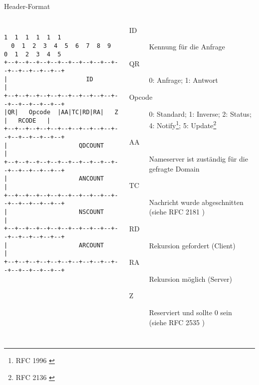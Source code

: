 \documentclass{beamer}
\begin{document}
  \begin{frame}[fragile]{\mytitle}{Header-Format}
    \begin{columns}[c]
      \column{5cm}
      \tiny{
        \begin{verbatim}
                                1  1  1  1  1  1
  0  1  2  3  4  5  6  7  8  9  0  1  2  3  4  5
+--+--+--+--+--+--+--+--+--+--+--+--+--+--+--+--+
|                      ID                       |
+--+--+--+--+--+--+--+--+--+--+--+--+--+--+--+--+
|QR|   Opcode  |AA|TC|RD|RA|   Z    |   RCODE   |
+--+--+--+--+--+--+--+--+--+--+--+--+--+--+--+--+
|                    QDCOUNT                    |
+--+--+--+--+--+--+--+--+--+--+--+--+--+--+--+--+
|                    ANCOUNT                    |
+--+--+--+--+--+--+--+--+--+--+--+--+--+--+--+--+
|                    NSCOUNT                    |
+--+--+--+--+--+--+--+--+--+--+--+--+--+--+--+--+
|                    ARCOUNT                    |
+--+--+--+--+--+--+--+--+--+--+--+--+--+--+--+--+
        \end{verbatim}
      } 
      \column{7cm}
      \footnotesize{
        \begin{description}
          \item[ID] Kennung für die Anfrage
          \item[QR] 0: Anfrage; 1: Antwort
          \item[Opcode] 0: Standard; 1: Inverse; 2: Status; 4: Notify\footnote{RFC 1996 \cite{rfc1996}}; 5: Update\footnote{RFC 2136 \cite{rfc2136}}
          \item[AA] Nameserver ist zuständig für die gefragte Domain
          \item[TC] Nachricht wurde abgeschnitten (siehe RFC 2181 \cite{rfc2181})
          \item[RD] Rekursion gefordert (Client)
          \item[RA] Rekursion möglich (Server)
          \item[Z] Reserviert und sollte 0 sein\\(siehe RFC 2535 \cite{rfc2535})
        \end{description}
      }
    \end{columns}
\end{frame}
\end{document}
